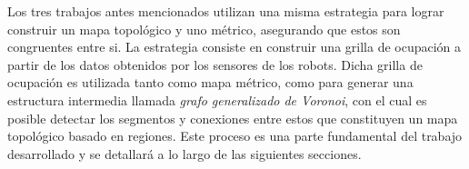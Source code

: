 Los tres trabajos antes mencionados utilizan una misma estrategia para lograr construir un mapa topológico y uno métrico, asegurando que estos son congruentes entre si. La estrategia consiste en construir una grilla de ocupación a partir de los datos obtenidos por los sensores de los robots. Dicha grilla de ocupación es utilizada tanto como mapa métrico, como para generar una estructura intermedia llamada \emph{grafo generalizado de Voronoi}, con el cual es posible detectar los segmentos y conexiones entre estos que constituyen un mapa topológico basado en regiones. Este proceso es una parte fundamental del trabajo desarrollado  y se detallará a lo largo de las siguientes secciones.

% 





